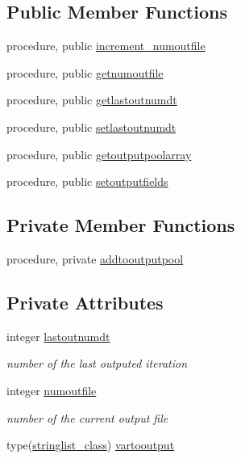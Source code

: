\subsection*{Public Member Functions}
\begin{DoxyCompactItemize}
\item 
procedure, public \mbox{\hyperlink{structsimulationglobals__mod_1_1output__t_a6056a47d4ba3c7ba061f4231c59beb71}{increment\+\_\+numoutfile}}
\item 
procedure, public \mbox{\hyperlink{structsimulationglobals__mod_1_1output__t_aa6589029b9f3fe175370dd07d1c2f8d8}{getnumoutfile}}
\item 
procedure, public \mbox{\hyperlink{structsimulationglobals__mod_1_1output__t_af0af2c64c363c711d7c26cdd03cde406}{getlastoutnumdt}}
\item 
procedure, public \mbox{\hyperlink{structsimulationglobals__mod_1_1output__t_a7208aae153eb3f3c90bb547aef268012}{setlastoutnumdt}}
\item 
procedure, public \mbox{\hyperlink{structsimulationglobals__mod_1_1output__t_a145155554e01989022e0473e8a11bb53}{getoutputpoolarray}}
\item 
procedure, public \mbox{\hyperlink{structsimulationglobals__mod_1_1output__t_abf1812daba1e60e7a570a49e14502b11}{setoutputfields}}
\end{DoxyCompactItemize}
\subsection*{Private Member Functions}
\begin{DoxyCompactItemize}
\item 
procedure, private \mbox{\hyperlink{structsimulationglobals__mod_1_1output__t_a8502a713450f398f59c6bab67ed6cde9}{addtooutputpool}}
\end{DoxyCompactItemize}
\subsection*{Private Attributes}
\begin{DoxyCompactItemize}
\item 
integer \mbox{\hyperlink{structsimulationglobals__mod_1_1output__t_abe175b060fb276ed8591f82c2e052393}{lastoutnumdt}}
\begin{DoxyCompactList}\small\item\em number of the last outputed iteration \end{DoxyCompactList}\item 
integer \mbox{\hyperlink{structsimulationglobals__mod_1_1output__t_a1df9064be51b29e5cb017c161db70511}{numoutfile}}
\begin{DoxyCompactList}\small\item\em number of the current output file \end{DoxyCompactList}\item 
type(\mbox{\hyperlink{structsimulationglobals__mod_1_1stringlist__class}{stringlist\+\_\+class}}) \mbox{\hyperlink{structsimulationglobals__mod_1_1output__t_a12ae742ee427e1fc02644195444291cd}{vartooutput}}
\end{DoxyCompactItemize}


